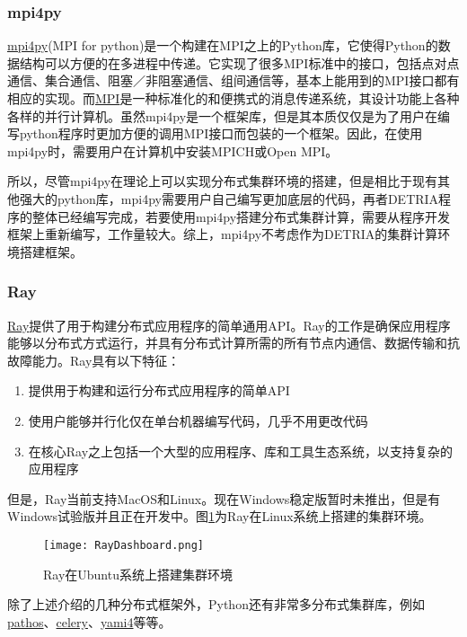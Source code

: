 \subsubsection{mpi4py}
\href{https://pypi.org/project/mpi4py/}{mpi4py}(MPI for python)是一个构建在MPI之上的Python库，它使得Python的数据结构可以方便的在多进程中传递。它实现了很多MPI标准中的接口，包括点对点通信、集合通信、阻塞／非阻塞通信、组间通信等，基本上能用到的MPI接口都有相应的实现。而\href{https://www.open-mpi.org/}{MPI}是一种标准化的和便携式的消息传递系统，其设计功能上各种各样的并行计算机。虽然mpi4py是一个框架库，但是其本质仅仅是为了用户在编写python程序时更加方便的调用MPI接口而包装的一个框架。因此，在使用mpi4py时，需要用户在计算机中安装MPICH或Open MPI。

所以，尽管mpi4py在理论上可以实现分布式集群环境的搭建，但是相比于现有其他强大的python库，mpi4py需要用户自己编写更加底层的代码，再者DETRIA程序的整体已经编写完成，若要使用mpi4py搭建分布式集群计算，需要从程序开发框架上重新编写，工作量较大。综上，mpi4py不考虑作为DETRIA的集群计算环境搭建框架。

\subsubsection{Ray}
\href{https://ray.io/}{Ray}提供了用于构建分布式应用程序的简单通用API。Ray的工作是确保应用程序能够以分布式方式运行，并具有分布式计算所需的所有节点内通信、数据传输和抗故障能力。Ray具有以下特征：
\begin{enumerate}
    \item 提供用于构建和运行分布式应用程序的简单API
    \item 使用户能够并行化仅在单台机器编写代码，几乎不用更改代码
    \item 在核心Ray之上包括一个大型的应用程序、库和工具生态系统，以支持复杂的应用程序
\end{enumerate}

但是，Ray当前支持MacOS和Linux。现在Windows稳定版暂时未推出，但是有Windows试验版并且正在开发中。图\ref{Ray在Ubuntu系统上搭建集群环境}为Ray在Linux系统上搭建的集群环境。
\begin{figure}[h]
    \centering
    \texttt{[image: RayDashboard.png]}
    \caption{Ray在Ubuntu系统上搭建集群环境}
    \label{Ray在Ubuntu系统上搭建集群环境}
\end{figure}

除了上述介绍的几种分布式框架外，Python还有非常多分布式集群库，例如\href{https://pypi.org/project/pathos/}{pathos}、\href{https://pypi.org/project/celery/}{celery}、\href{http://www.inspirel.com/yami4/}{yami4}等等。